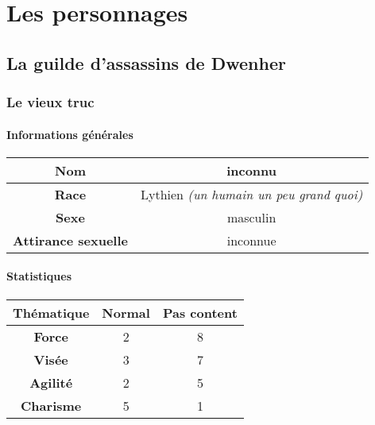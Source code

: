 \documentclass[11pt,a4paper]{book}
\begin{document}
\chapter{Les personnages}

\section{La guilde d'assassins de Dwenher}

\subsection{Le vieux truc}

\subsubsection{Informations générales}

\begin{tabular}{|c|c|}
\hline
\textbf{Nom} & inconnu \\
\hline
\textbf{Race} & Lythien \textit{(un humain un peu grand quoi)} \\
\hline
\textbf{Sexe} & masculin \\
\hline
\textbf{Attirance sexuelle} & inconnue \\
\hline
\end{tabular}

\subsubsection{Statistiques}

\begin{tabular}{|c|c|c|}
\hline
\textbf{Thématique} & \textbf{Normal} & \textbf{Pas content} \\
\hline
\textbf{Force} & 2 & 8 \\
\hline
\textbf{Visée} & 3 & 7 \\
\hline
\textbf{Agilité} & 2 & 5 \\
\hline
\textbf{Charisme} & 5 & 1 \\
\hline
\end{tabular}
\end{document}
